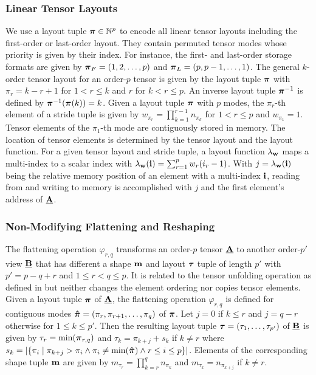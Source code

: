 \subsubsection{Linear Tensor Layouts}
\label{sec:preliminaries:layout}
We use a layout tuple $\boldsymbol{\pi} \in \mathbb{N}^p$ to encode all linear tensor layouts including the first-order or last-order layout.
They contain permuted tensor modes whose priority is given by their index.
For instance, the first- and last-order storage formats are given by $\boldsymbol{\pi}_F = (1,2,\dots,p)$ and $\boldsymbol{\pi}_{L} = (p,p-1,\dots,1)$.
The general $k$-order tensor layout for an order-$p$ tensor is given by the layout tuple $\boldsymbol{\pi}$ with $\pi_r = k-r+1$ for $1 < r \leq k$ and $r$ for $k < r \leq p$.
An inverse layout tuple $\boldsymbol{\pi}^{-1}$ is defined by $\boldsymbol{\pi}^{-1}(\boldsymbol{\pi}(k)) = k$.
Given a layout tuple $\boldsymbol{\pi}$ with $p$ modes, the $\pi_r$-th element of a stride tuple is given by $w_{\pi_r} = \prod_{k=1}^{r-1} n_{\pi_k}$ for $1 < r \leq p$ and $w_{\pi_1} = 1$.
Tensor elements of the $\pi_1$-th mode are contiguously stored in memory.
The location of tensor elements is determined by the tensor layout and the layout function.
For a given tensor layout and stride tuple, a layout function $\lambda_{\mathbf{w}}$ maps a multi-index to a scalar index with $\lambda_{\mathbf{w}}(\mathbf{i}) = \sum_{r=1}^p w_r (i_r-1)$.
With $j = \lambda_{\mathbf{w}} (\mathbf{i})$ being the relative memory position of an element with a multi-index $\mathbf{i}$, reading from and writing to memory is accomplished with $j$ and the first element's address of $\underline{\mathbf{A}}$.
\vspace{-1em}

\subsubsection{Non-Modifying Flattening and Reshaping}
\label{sec:preliminaries:flattening.reshaping}
The flattening operation $\varphi_{r,q}$ transforms an order-$p$ tensor $\underline{\mathbf{A}}$ to another order-$p'$ view $\underline{\mathbf{B}}$ that has different a shape $\mathbf{m}$ and layout $\boldsymbol{\tau}$ tuple of length $p'$ with $p' = p-q+r$ and $1 \leq r < q \leq p$.
It is related to the tensor unfolding operation as defined in \cite[p.459]{kolda:2009:decompositions} but neither changes the element ordering nor copies tensor elements.
Given a layout tuple $\boldsymbol{\pi}$ of $\underline{\mathbf{A}}$, the flattening operation $\varphi_{r,q}$ is defined for contiguous modes $\boldsymbol{\hat{\pi}} = (\pi_r,\pi_{r+1}, \dots, \pi_{q})$ of $\boldsymbol{\pi}$.
Let $j = 0$ if $k \leq r$ and $j = q-r$ otherwise for $1 \leq k \leq p'$.
Then the resulting layout tuple $\boldsymbol{\tau} = (\tau_1,\dots,\tau_{p'})$ of $\underline{\mathbf{B}}$ is given by $\tau_r = \min(\boldsymbol{\pi}_{r,q})$ and $\tau_{k} = \pi_{k+j} + s_k$ if $k \neq r$ where $s_k = \left| \{ \pi_i \mid \pi_{k+j} > \pi_i \wedge \pi_i \neq \min(\boldsymbol{\hat{\pi}}) \wedge r \leq i \leq p \} \right|$.
Elements of the corresponding shape tuple $\mathbf{m}$ are given by $m_{\tau_r} = \prod_{k=r}^q n_{\pi_k}$ and $m_{\tau_k} = n_{\pi_{k+j}}$ if $k \neq r$.

